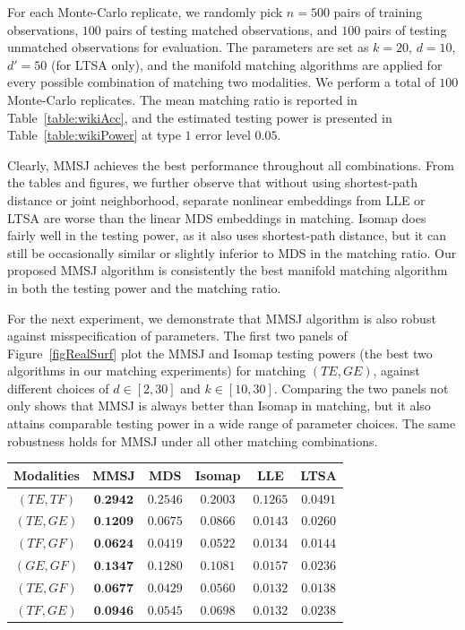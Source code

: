 \documentclass[times,twocolumn,final]{elsarticle}
\newenvironment{Table}
  {\par\bigskip\noindent\minipage{\columnwidth}\centering}
  {\endminipage\par\bigskip}
\begin{document}
For each Monte-Carlo replicate, we randomly pick $n=500$ pairs of training observations, $100$ pairs of testing matched observations, and $100$ pairs of testing unmatched observations for evaluation. The parameters are set as $k=20$, $d=10$, $d'=50$ (for LTSA only), and the manifold matching algorithms are applied for every possible combination of matching two modalities. We perform a total of $100$ Monte-Carlo replicates. The mean matching ratio is reported in Table~\ref{table:wikiAcc}, and the estimated testing power is presented in Table~\ref{table:wikiPower} at type $1$ error level $0.05$.

Clearly, MMSJ achieves the best performance throughout all combinations. From the tables and figures, we further observe that without using shortest-path distance or joint neighborhood, separate nonlinear embeddings from LLE or LTSA are worse than the linear MDS embeddings in matching. Isomap does fairly well in the testing power, as it also uses shortest-path distance, but it can still be occasionally similar or slightly inferior to MDS in the matching ratio. Our proposed MMSJ algorithm is consistently the best manifold matching algorithm in both the testing power and the matching ratio.

For the next experiment, we demonstrate that MMSJ algorithm is also robust against misspecification of parameters. The first two panels of Figure~\ref{figRealSurf} plot the MMSJ and Isomap testing powers (the best two algorithms in our matching experiments) for matching $(TE,GE)$, against different choices of $d \in [2,30]$ and $k \in [10,30]$. Comparing the two panels not only shows that MMSJ is always better than Isomap in matching, but it also attains comparable testing power in a wide range of parameter choices.
The same robustness holds for MMSJ under all other matching combinations. 

\begin{Table}
\centering
{}
\label{table:wikiAcc}%
\begin{tabular}{|c||c|c|c|c|c|}
\hline
Modalities & MMSJ & MDS & Isomap & LLE & LTSA \\
\hline
$(TE, TF)$ & $\textbf{0.2942}$  & $0.2546$ & $0.2003$ & $0.1265$ & $0.0491$\\
\hline
$(TE, GE)$ & $\textbf{0.1209}$  & $0.0675$ & $0.0866$ & $0.0143$ & $0.0260$\\
\hline
$(TF, GF)$ & $\textbf{0.0624}$  & $0.0419$ & $0.0522$ & $0.0134$ & $0.0144$\\
\hline
$(GE, GF)$ & $\textbf{0.1347}$  & $0.1280$ & $0.1081$ & $0.0157$ & $0.0236$\\
\hline
$(TE, GF)$ & $\textbf{0.0677}$  & $0.0429$ & $0.0560$ & $0.0132$ & $0.0138$\\
\hline
$(TF, GE)$ & $\textbf{0.0946}$  & $0.0545$ & $0.0698$ & $0.0132$ & $0.0238$\\
\hline
\end{tabular}
\end{Table}
\end{document}
